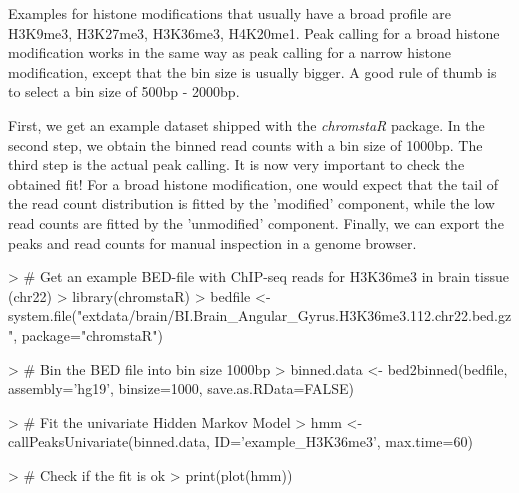 \documentclass[11pt]{article}
\newcommand{\Rpackage}[1]{{\textit{#1}}}
\begin{document}
Examples for histone modifications that usually have a broad profile are H3K9me3, H3K27me3, H3K36me3, H4K20me1. Peak calling for a broad histone modification works in the same way as peak calling for a narrow histone modification, except that the bin size is usually bigger. A good rule of thumb is to select a bin size of 500bp - 2000bp.

First, we get an example dataset shipped with the \Rpackage{chromstaR} package. In the second step, we obtain the binned read counts with a bin size of 1000bp. The third step is the actual peak calling. It is now very important to check the obtained fit! For a broad histone modification, one would expect that the tail of the read count distribution is fitted by the 'modified' component, while the low read counts are fitted by the 'unmodified' component. Finally, we can export the peaks and read counts for manual inspection in a genome browser.

\begin{scriptsize}
\begin{Schunk}
\begin{Sinput}
> # Get an example BED-file with ChIP-seq reads for H3K36me3 in brain tissue (chr22)
> library(chromstaR)
> bedfile <- system.file("extdata/brain/BI.Brain_Angular_Gyrus.H3K36me3.112.chr22.bed.gz", package="chromstaR")
\end{Sinput}
\end{Schunk}
\end{scriptsize}

\begin{scriptsize}
\begin{Schunk}
\begin{Sinput}
> # Bin the BED file into bin size 1000bp
> binned.data <- bed2binned(bedfile, assembly='hg19', binsize=1000, save.as.RData=FALSE)
\end{Sinput}
\end{Schunk}
\end{scriptsize}

\begin{scriptsize}
\begin{Schunk}
\begin{Sinput}
> # Fit the univariate Hidden Markov Model
> hmm <- callPeaksUnivariate(binned.data, ID='example_H3K36me3', max.time=60)
\end{Sinput}
\end{Schunk}
\end{scriptsize}

\begin{scriptsize}
\begin{Schunk}
\begin{Sinput}
> # Check if the fit is ok
> print(plot(hmm))
\end{Sinput}
\end{Schunk}
\end{scriptsize}
\end{document}
